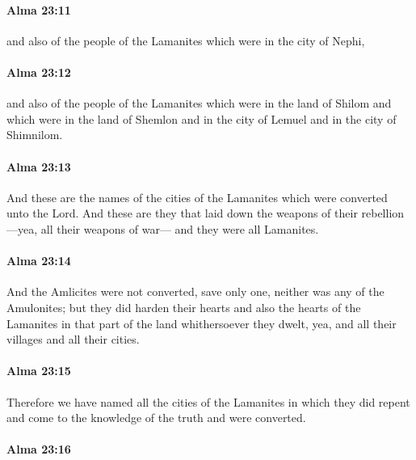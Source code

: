 		\paragraph{Alma 23:11} %
			\label{ALMA-23-11}

			and also of the people of the Lamanites which were in the city of Nephi,

		\paragraph{Alma 23:12} %
			\label{ALMA-23-12}

			and also of the people of the Lamanites which were in the land of Shilom
			and which were in the land of Shemlon
			and in the city of Lemuel and in the city of Shimnilom.

		\paragraph{Alma 23:13} %
			\label{ALMA-23-13}

			And these are the names of the cities of the Lamanites
			which were converted unto the Lord.
			And these are they that laid down the weapons of their rebellion
			---yea, all their weapons of war---
			and they were all Lamanites.

		\paragraph{Alma 23:14} %
			\label{ALMA-23-14}

			And the Amlicites were not converted, save only one,
			neither was any of the Amulonites;
			but they did harden their hearts
			and also the hearts of the Lamanites in that part of the land
			whithersoever they dwelt,
			yea, and all their villages and all their cities.

		\paragraph{Alma 23:15} %
			\label{ALMA-23-15}

			Therefore we have named all the cities of the Lamanites
			in which they did repent
			and come to the knowledge of the truth
			and were converted.

		\paragraph{Alma 23:16} %
			\label{ALMA-23-16}

